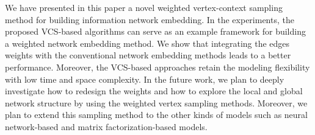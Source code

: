 We have presented in this paper a novel weighted vertex-context sampling method for building information network embedding. In the experiments, the proposed VCS-based algorithms can serve as an example framework for building a weighted network embedding method. We show that integrating the edges weights with the conventional network embedding methods leads to a better performance. Moreover, the VCS-based approaches retain the modeling  flexibility with low time and space complexity. In the future work, we plan to deeply investigate how to redesign the weights and how to explore the local and global network structure by using the weighted vertex sampling methods. Moreover, we plan to extend this sampling method to the other kinds of models such as neural network-based and matrix factorization-based models.



%


